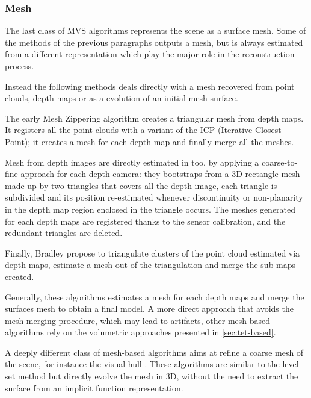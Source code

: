 \subsubsection{Mesh}

The last class of MVS algorithms represents the scene as a surface mesh. Some of the methods of the previous paragraphs outputs a mesh, but is always estimated from a different representation which play the major role in the reconstruction process.

Instead the following methods deals directly with a mesh recovered from point clouds, depth maps or as a evolution of an initial mesh surface.

The early Mesh Zippering algorithm \cite{turk1994zippered} creates a triangular mesh from depth maps. It registers all the point clouds with a variant of the ICP (Iterative Closest Point); it creates a mesh for each depth map and finally merge all the meshes.

Mesh from depth images are directly estimated in \cite{pollefeys_et_al_08} too, by applying a coarse-to-fine approach for each depth camera: they bootstraps from a 3D rectangle mesh made up by two triangles that covers all the depth image, each triangle is subdivided and its position re-estimated whenever discontinuity or non-planarity in the depth map region enclosed in the triangle occurs. The meshes generated for each depth maps are registered thanks to the sensor calibration, and the redundant triangles are deleted.

Finally, Bradley \etal \cite{bradley2008accurate} propose to triangulate clusters of the point cloud estimated via depth maps, estimate a mesh out of the triangulation and merge the sub maps created.

Generally, these algorithms estimates a mesh for each depth maps and merge the surfaces mesh to obtain a final model.
A more direct approach that avoids the mesh merging procedure, which may lead to artifacts, other mesh-based algorithms rely on the volumetric approaches presented in \ref{sec:tet-based}.

A deeply different class of mesh-based algorithms aims at refine a coarse mesh of the scene, for instance the visual hull \cite{hiep2009towards,zaharescu2007transformesh,delaunoy_et_al_08,gargallo2007minimizing,delaunoy2011gradient,vu2011large}. These algorithms are similar to the level-set method but directly evolve the mesh in 3D, without the need to extract the surface from an implicit function representation.

